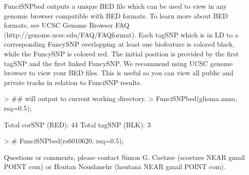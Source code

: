 \documentclass[a4paper]{article}
\begin{document}
  FunciSNPbed outputs a unique BED file which can be used to view in any genomic 
browser compatible with BED formats. To learn more about BED formats, see UCSC 
Genome Browser FAQ (http://genome.ucsc.edu/FAQ/FAQformat). Each tagSNP 
which is in LD to a corresponding FuncySNP overlapping at least one biofeature
 is colored black, while the FuncySNP is colored red. The initial position is 
 provided by the first tagSNP and the first linked FuncySNP. We recommend 
 using UCSC genome browser to view your BED files. This is useful so you can 
 view all public and private tracks in relation to FunciSNP results.
\begin{Schunk}
\begin{Sinput}
> ## will output to current working directory.
> FunciSNPbed(glioma.anno, rsq=0.5);
\end{Sinput}
\begin{Soutput}
Total corSNP (RED):  44 
Total tagSNP (BLK):  3 
\end{Soutput}
\begin{Sinput}
> # FunciSNPbed(rs6010620, rsq=0.5);
\end{Sinput}
\end{Schunk}

\newpage

Questions or comments, please contact Simon G. Coetzee (scoetzee NEAR gmail 
 POINT com) or Houtan Noushmehr (houtana NEAR gmail POINT com).
\end{document}
